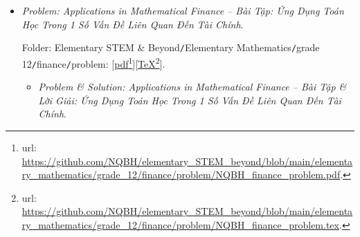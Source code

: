 \documentclass[12pt]{article}
\begin{document}
\begin{itemize}
	Folder: {\sf Elementary STEM \& Beyond{\tt/}Elementary Mathematics{\tt/}grade 12{\tt/}optimization{\tt/}problem}: [\href{https://github.com/NQBH/elementary_STEM_beyond/blob/main/elementary_mathematics/grade_12/optimization/problem/NQBH_optimization_problem.pdf}{pdf}\footnote{{\sc url}: \url{https://github.com/NQBH/elementary_STEM_beyond/blob/main/elementary_mathematics/grade_12/optimization/problem/NQBH_optimization_problem.pdf}.}][\href{https://github.com/NQBH/elementary_STEM_beyond/blob/main/elementary_mathematics/grade_12/optimization/problem/NQBH_optimization_problem.tex}{\TeX}\footnote{{\sc url}: \url{https://github.com/NQBH/elementary_STEM_beyond/blob/main/elementary_mathematics/grade_12/optimization/problem/NQBH_optimization_problem.tex}.}].
	\begin{itemize}
		\item {\it Problem \& Solution: Mathematical Optimization -- Bài Tập \& Lời Giải: Ứng Dụng Toán Học Để Giải Quyết 1 Số Bài Toán Tối Ưu}.
		
		Folder: {\sf Elementary STEM \& Beyond{\tt/}Elementary Mathematics{\tt/}grade 12{\tt/}optimization{\tt/}solution}: [\href{https://github.com/NQBH/elementary_STEM_beyond/blob/main/elementary_mathematics/grade_12/optimization/solution/NQBH_optimization_solution.pdf}{pdf}\footnote{{\sc url}: \url{https://github.com/NQBH/elementary_STEM_beyond/blob/main/elementary_mathematics/grade_12/optimization/solution/NQBH_optimization_solution.pdf}.}][\href{https://github.com/NQBH/elementary_STEM_beyond/blob/main/elementary_mathematics/grade_12/optimization/solution/NQBH_optimization_solution.tex}{\TeX}\footnote{{\sc url}: \url{https://github.com/NQBH/elementary_STEM_beyond/blob/main/elementary_mathematics/grade_12/optimization/solution/NQBH_optimization_solution.tex}.}].
	\end{itemize}
	\item {\it Problem: Applications in Mathematical Finance -- Bài Tập: Ứng Dụng Toán Học Trong 1 Số Vấn Đề Liên Quan Đến Tài Chính}.
	
	Folder: {\sf Elementary STEM \& Beyond{\tt/}Elementary Mathematics{\tt/}grade 12{\tt/}finance{\tt/}problem}: [\href{https://github.com/NQBH/elementary_STEM_beyond/blob/main/elementary_mathematics/grade_12/finance/problem/NQBH_finance_problem.pdf}{pdf}\footnote{{\sc url}: \url{https://github.com/NQBH/elementary_STEM_beyond/blob/main/elementary_mathematics/grade_12/finance/problem/NQBH_finance_problem.pdf}.}][\href{https://github.com/NQBH/elementary_STEM_beyond/blob/main/elementary_mathematics/grade_12/finance/problem/NQBH_finance_problem.tex}{\TeX}\footnote{{\sc url}: \url{https://github.com/NQBH/elementary_STEM_beyond/blob/main/elementary_mathematics/grade_12/finance/problem/NQBH_finance_problem.tex}.}].
	\begin{itemize}
		\item {\it Problem \& Solution: Applications in Mathematical Finance -- Bài Tập \& Lời Giải: Ứng Dụng Toán Học Trong 1 Số Vấn Đề Liên Quan Đến Tài Chính}.
		

\end{itemize}
\end{itemize}
\end{document}
